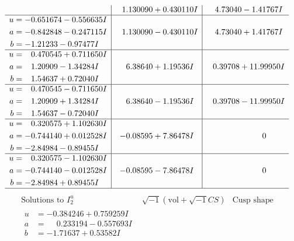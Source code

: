 \documentclass[1p]{elsarticle_modified}
\theoremstyle{definition}
\newcommand{\I}{\sqrt{-1}}
\begin{document}
$$\begin{array}{c|c|c}
 & \phantom{-}1.130090 + 0.430110 I & \phantom{-}4.73040 - 1.41767 I \\ \hline\begin{aligned}
u &= -0.651674 - 0.556635 I \\
a &= -0.842848 - 0.247115 I \\
b &= -1.21233 - 0.97477 I\end{aligned}
 & \phantom{-}1.130090 - 0.430110 I & \phantom{-}4.73040 + 1.41767 I \\ \hline\begin{aligned}
u &= \phantom{-}0.470545 + 0.711650 I \\
a &= \phantom{-}1.20909 - 1.34284 I \\
b &= \phantom{-}1.54637 + 0.72040 I\end{aligned}
 & \phantom{-}6.38640 + 1.19536 I & \phantom{-}0.39708 + 11.99950 I \\ \hline\begin{aligned}
u &= \phantom{-}0.470545 - 0.711650 I \\
a &= \phantom{-}1.20909 + 1.34284 I \\
b &= \phantom{-}1.54637 - 0.72040 I\end{aligned}
 & \phantom{-}6.38640 - 1.19536 I & \phantom{-}0.39708 - 11.99950 I \\ \hline\begin{aligned}
u &= \phantom{-}0.320575 + 1.102630 I \\
a &= -0.744140 + 0.012528 I \\
b &= -2.84984 - 0.89455 I\end{aligned}
 & -0.08595 + 7.86478 I & \phantom{-0.000000 } 0 \\ \hline\begin{aligned}
u &= \phantom{-}0.320575 - 1.102630 I \\
a &= -0.744140 - 0.012528 I \\
b &= -2.84984 + 0.89455 I\end{aligned}
 & -0.08595 - 7.86478 I & \phantom{-0.000000 } 0\\
 \hline 
 \end{array}$$\newpage$$\begin{array}{c|c|c}  
\text{Solutions to }I^u_{2}& \I (\text{vol} + \sqrt{-1}CS) & \text{Cusp shape}\\
 \hline 
\begin{aligned}
u &= -0.384246 + 0.759259 I \\
a &= \phantom{-}0.233194 - 0.557693 I \\
b &= -1.71637 + 0.53582 I\end{aligned}

\end{array}$$
\end{document}
